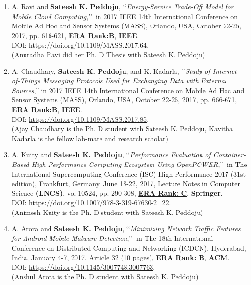 \begin{enumerate}
	
	\item
	A. Ravi and \textbf{Sateesh K. Peddoju}, \lq\lq \textit{Energy-Service Trade-Off Model for Mobile Cloud Computing},\rq\rq\, in 2017 IEEE 14th International Conference on Mobile Ad Hoc and Sensor Systems (MASS), Orlando, USA, October 22-25, 2017, pp. 616-621, \underline{\textbf{ERA Rank:B}}, \textbf{IEEE}. \\DOI: \url{https://doi.org/10.1109/MASS.2017.64}. \\(Anuradha Ravi did her Ph. D Thesis with Sateesh K. Peddoju)

	
		\item
	A. Chaudhary, \textbf{Sateesh K. Peddoju}, and K. Kadarla, \lq\lq \textit{Study of Internet-of-Things Messaging Protocols Used for Exchanging Data with External Sources},\rq\rq\,in 2017 IEEE 14th International Conference on Mobile Ad Hoc and Sensor Systems (MASS), Orlando, USA, October 22-25, 2017, pp. 666-671, \underline{\textbf{ERA Rank:B}}, \textbf{IEEE}. \\DOI: \url{https://doi.org/10.1109/MASS.2017.85}. \\(Ajay Chaudhary is the Ph. D student with Sateesh K. Peddoju, Kavitha Kadarla is the fellow lab-mate and research scholar)

	
	\item
	A. Kuity and \textbf{Sateesh K. Peddoju}, \lq\lq \textit{Performance Evaluation of Container-Based High Performance Computing Ecosystem Using OpenPOWER},\rq\rq\, in The International Supercomputing Conference (ISC) High Performance 2017 (31st edition), Frankfurt, Germany, June 18-22, 2017, Lecture Notes in Computer Science \textbf{(LNCS)}, vol 10524, pp. 290-308,  \underline{\textbf{ERA Rank: C}}, \textbf{Springer}. \\DOI: \url{https://doi.org/10.1007/978-3-319-67630-2_22}. \\(Animesh Kuity is the Ph. D student with Sateesh K. Peddoju)

	
	\item
	A. Arora and \textbf{Sateesh K. Peddoju}, \lq\lq \textit{Minimizing Network Traffic Features for Android Mobile Malware Detection},\rq\rq\, in The 18th International Conference on Distributed Computing and Networking (ICDCN), Hyderabad, India, January 4-7, 2017, Article 32 (10 pages), \underline{\textbf{ERA Rank: B}}, \textbf{ACM}.  \\DOI: \url{https://doi.org/10.1145/3007748.3007763}. \\ (Anshul Arora is the Ph. D student with Sateesh K. Peddoju)


\end{enumerate}
